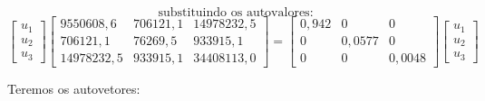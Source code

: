 \documentclass[
  openany]{book}
\begin{document}
\[\mbox{substituindo os autovalores:}\]
\[\begin{bmatrix}
u_1\\ u_2 \\ u_3
\end{bmatrix}
\begin{bmatrix}
9550608,6  &706121,1 &14978232,5\\ 
706121,1 &76269,5 & 933915,1 \\
14978232,5&933915,1&34408113,0
\end{bmatrix}  = \begin{bmatrix}0,942&0&0 \\ 0&0,0577&0 \\0&0& 0,0048 \end{bmatrix}\begin{bmatrix}
u_1\\ u_2 \\ u_3
\end{bmatrix}\]

Teremos os autovetores:
\end{document}
